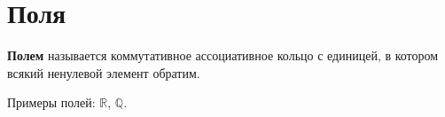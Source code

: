 \section{Поля}
\textbf{Полем} называется коммутативное ассоциативное кольцо с единицей, в котором всякий ненулевой элемент обратим.

Примеры полей: $\mathbb{R}$, $\mathbb{Q}$.	
